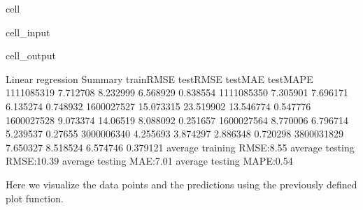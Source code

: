 \documentclass[letterpaper,10pt,english]{jupyterBook}
\begin{document}
\begin{sphinxuseclass}{cell}
\begin{sphinxVerbatimInput}
\begin{sphinxuseclass}{cell_input}
\end{sphinxuseclass}\end{sphinxVerbatimInput}
\begin{sphinxVerbatimOutput}

\begin{sphinxuseclass}{cell_output}
\begin{sphinxVerbatim}[commandchars=\\\{\}]
Linear regression Summary
            trainRMSE   testRMSE    testMAE  testMAPE
1111085319   7.712708   8.232999   6.568929  0.838554
1111085350   7.305901   7.696171   6.135274  0.748932
1600027527  15.073315  23.519902  13.546774  0.547776
1600027528   9.073374   14.06519   8.088092  0.251657
1600027564   8.770006   6.796714   5.239537   0.27655
3000006340   4.255693   3.874297   2.886348  0.720298
3800031829   7.650327   8.518524   6.574746  0.379121
average training RMSE:8.55
average testing RMSE:10.39
average testing MAE:7.01
average testing MAPE:0.54
\end{sphinxVerbatim}

\end{sphinxuseclass}\end{sphinxVerbatimOutput}

\end{sphinxuseclass}
\sphinxAtStartPar
Here we visualize the data points and the predictions using the previously defined plot function.
\end{document}
